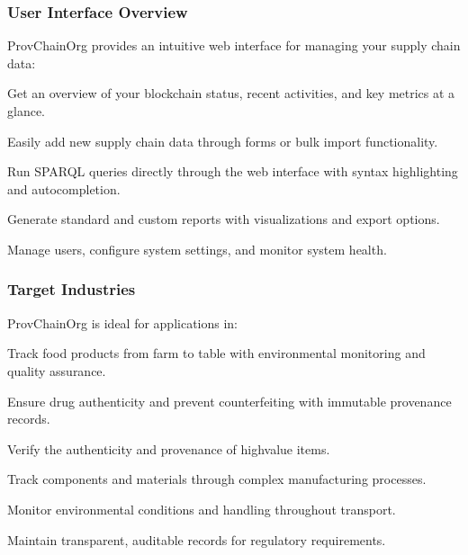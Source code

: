 \documentclass[letterpaper,10pt,english]{sphinxmanual}
\begin{document}
\subsubsection{User Interface Overview}
\label{\detokenize{user-guide/introduction:user-interface-overview}}
\sphinxAtStartPar
ProvChainOrg provides an intuitive web interface for managing your supply chain data:
\begin{description}
\sphinxAtStartPar
Get an overview of your blockchain status, recent activities, and key metrics at a glance.

\sphinxAtStartPar
Easily add new supply chain data through forms or bulk import functionality.

\sphinxAtStartPar
Run SPARQL queries directly through the web interface with syntax highlighting and auto\sphinxhyphen{}completion.

\sphinxAtStartPar
Generate standard and custom reports with visualizations and export options.

\sphinxAtStartPar
Manage users, configure system settings, and monitor system health.

\end{description}


\subsubsection{Target Industries}
\label{\detokenize{user-guide/introduction:target-industries}}
\sphinxAtStartPar
ProvChainOrg is ideal for applications in:
\begin{description}
\sphinxAtStartPar
Track food products from farm to table with environmental monitoring and quality assurance.

\sphinxAtStartPar
Ensure drug authenticity and prevent counterfeiting with immutable provenance records.

\sphinxAtStartPar
Verify the authenticity and provenance of high\sphinxhyphen{}value items.

\sphinxAtStartPar
Track components and materials through complex manufacturing processes.

\sphinxAtStartPar
Monitor environmental conditions and handling throughout transport.

\sphinxAtStartPar
Maintain transparent, auditable records for regulatory requirements.

\end{description}
\end{document}
